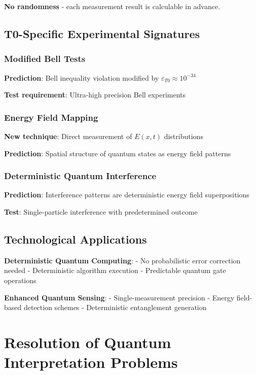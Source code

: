 \documentclass[12pt,a4paper]{article}
\newcommand{\Efield}{E}
\begin{document}
	\textbf{No randomness} - each measurement result is calculable in advance.
	
	\subsection{T0-Specific Experimental Signatures}
	
	\subsubsection{Modified Bell Tests}
	
	\textbf{Prediction}: Bell inequality violation modified by $\varepsilon_{T0} \approx 10^{-34}$
	
	\textbf{Test requirement}: Ultra-high precision Bell experiments
	
	\subsubsection{Energy Field Mapping}
	
	\textbf{New technique}: Direct measurement of $\Efield(x,t)$ distributions
	
	\textbf{Prediction}: Spatial structure of quantum states as energy field patterns
	
	\subsubsection{Deterministic Quantum Interference}
	
	\textbf{Prediction}: Interference patterns are deterministic energy field superpositions
	
	\textbf{Test}: Single-particle interference with predetermined outcome
	
	\subsection{Technological Applications}
	
	\textbf{Deterministic Quantum Computing}:
	- No probabilistic error correction needed
	- Deterministic algorithm execution
	- Predictable quantum gate operations
	
	\textbf{Enhanced Quantum Sensing}:
	- Single-measurement precision
	- Energy field-based detection schemes
	- Deterministic entanglement generation
	
	\section{Resolution of Quantum Interpretation Problems}
	
\end{document}
